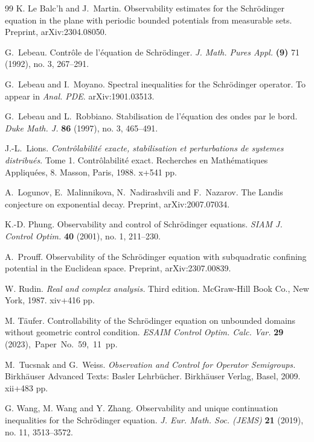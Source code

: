 \documentclass[a4paper,reqno]{amsart}
\theoremstyle{definition}
\numberwithin{equation}{section}
\begin{document}
\begin{thebibliography}{99}
	K. Le Balc'h and J.~Martin.
	Observability estimates for the Schrödinger equation in the plane with periodic bounded potentials from measurable sets.
	Preprint, arXiv:2304.08050. 
 
	G.~Lebeau.
 Contrôle de l’équation de Schrödinger. 
\emph{J. Math. Pures Appl.} \textbf{(9)} 71 (1992), no. 3, 267–291.	

	G.~Lebeau and I.~Moyano.
	Spectral inequalities for the Schr\"odinger operator.
	To appear in \emph{ Anal. PDE}. arXiv:1901.03513.

		G.~Lebeau and L.~Robbiano. 
  Stabilisation de l'\'equation des ondes par le bord.
  \emph{Duke Math. J.} \textbf{86} (1997), no. 3, 465–491. 

	J.-L.~Lions. {\it Contr\^olabilit\'e exacte, stabilisation et perturbations de systemes distribu\'es}. Tome 1. Contr\^olabilit\'e exact. Recherches en Mathématiques Appliquées, 8. Masson, Paris, 1988. x+541 pp. 
  
 A.~Logunov, E.~Malinnikova, N.~Nadirashvili and F.~Nazarov.	
 The Landis conjecture on exponential decay.
 Preprint, arXiv:2007.07034.
 
 

K.-D. Phung. Observability and control of Schrödinger equations. \emph{SIAM J. Control Optim.} \textbf{40} (2001), no. 1, 211–230.

	A.~Prouff.
	 Observability of the Schr\"odinger equation with subquadratic confining potential in the Euclidean space.
	Preprint, arXiv:2307.00839.
 


W. Rudin. \emph{Real and complex analysis.} Third edition. McGraw-Hill Book Co., New York, 1987. xiv+416 pp.		
		
		M. T\"aufer. 
		Controllability of the Schr\"odinger equation on unbounded domains without geometric control condition. 
		\emph{ESAIM Control Optim. Calc. Var.} \textbf{29} (2023),~Paper~No.~59,~11~pp. 

	M.~Tucsnak and G.~Weiss.
 \emph{Observation and Control for Operator Semigroups.}
 	Birkhäuser Advanced Texts: Basler Lehrbücher. Birkhäuser Verlag, Basel, 2009. xii+483 pp.
 
 G. Wang, M. Wang and Y. Zhang.
 Observability and unique continuation inequalities for the Schrödinger equation. \emph{J. Eur. Math. Soc. (JEMS)} \textbf{21} (2019), no. 11, 3513–3572.	
 

\end{thebibliography}
\end{document}
